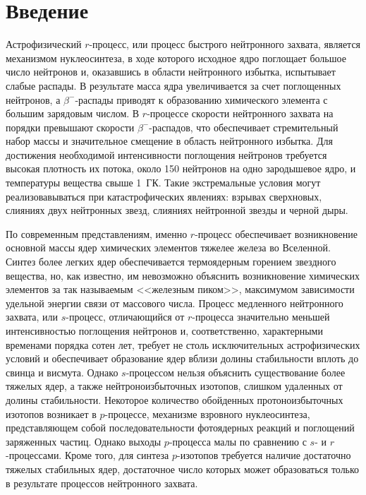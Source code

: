 \section{Введение}

Астрофизический $r$-процесс, или процесс быстрого нейтронного захвата, является механизмом нуклеосинтеза, в ходе которого исходное ядро поглощает большое число нейтронов и, оказавшись в области нейтронного избытка, испытывает слабые распады. В результате масса ядра увеличивается за счет поглощенных нейтронов, а $\beta^-$-распады приводят к образованию химического элемента с большим зарядовым числом. В $r$-процессе скорости нейтронного захвата на порядки превышают скорости $\beta^-$-распадов, что обеспечивает стремительный набор массы и значительное смещение в область нейтронного избытка. Для достижения необходимой интенсивности поглощения нейтронов требуется высокая плотность их потока, около 150 нейтронов на одно зародышевое ядро, и температуры вещества свыше 1~ГК. Такие экстремальные условия могут реализовавываться при катастрофических явлениях: взрывах сверхновых, слияниях двух нейтронных звезд, слияниях нейтронной звезды и черной дыры. 

По современным представлениям, именно $r$-процесс обеспечивает возникновение основной массы ядер химических элементов тяжелее железа во Вселенной. Синтез более легких ядер обеспечивается термоядерным горением звездного вещества, но, как известно, им невозможно объяснить возникновение химических элементов за так называемым <<железным пиком>>, максимумом зависимости удельной энергии связи от массового числа. Процесс медленного нейтронного захвата, или $s$-процесс, отличающийся от $r$-процесса значительно меньшей интенсивностью поглощения нейтронов и, соответственно, характерными временами порядка сотен лет, требует не столь исключительных астрофизических условий и обеспечивает образование ядер вблизи долины стабильности вплоть до свинца и висмута. Однако $s$-процессом нельзя объяснить существование более тяжелых ядер, а также нейтроноизбыточных изотопов, слишком удаленных от долины стабильности. Некоторое количество обойденных протоноизбыточных изотопов возникает в $p$-процессе, механизме взровного нуклеосинтеза, представляющем собой последовательности фотоядерных реакций и поглощений заряженных частиц. Однако выходы $p$-процесса малы по сравнению с $s$- и $r$-процессами. Кроме того, для синтеза $p$-изотопов требуется наличие достаточно тяжелых стабильных ядер, достаточное число которых может образоваться только в результате процессов нейтронного захвата. 

